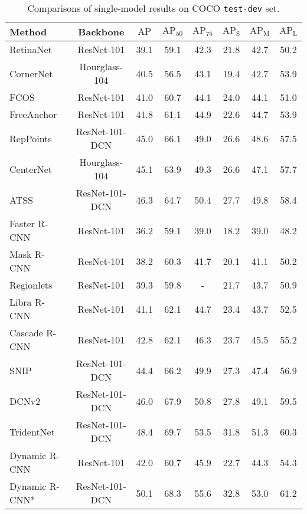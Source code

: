 \documentclass[runningheads]{llncs}
\begin{document}
\begin{table}[!t]
    \caption{Comparisons of single-model results on COCO \texttt{test-dev} set.}
    \label{tab:overall}
    \begin{center}
\setlength{\tabcolsep}{3pt}
\begin{tabular}{lccccccc}
\toprule
Method & Backbone & $\mathrm{AP}$ & $\mathrm{AP}_{50}$ & $\mathrm{AP}_{75}$ & $\mathrm{AP_S}$ & $\mathrm{AP_M}$ & $\mathrm{AP_L}$\\
\midrule
RetinaNet~\cite{FocalLoss} & ResNet-101 & 39.1 & 59.1 & 42.3 & 21.8 & 42.7 & 50.2\\
CornerNet~\cite{CornerNet} & Hourglass-104 & 40.5 & 56.5 & 43.1 & 19.4 & 42.7 & 53.9\\
FCOS~\cite{FCOS} & ResNet-101 & 41.0 & 60.7 & 44.1 & 24.0 & 44.1 & 51.0\\
FreeAnchor~\cite{FreeAnchor} & ResNet-101 & 41.8 & 61.1 & 44.9 & 22.6 & 44.7 & 53.9\\
RepPoints~\cite{RepPoints} & ResNet-101-DCN & 45.0 & 66.1 & 49.0 & 26.6 & 48.6 & 57.5\\
CenterNet~\cite{CenterNet} & Hourglass-104 & 45.1 & 63.9 & 49.3 & 26.6 & 47.1 & 57.7\\
ATSS~\cite{ATSS} & ResNet-101-DCN & 46.3 & 64.7 & 50.4 & 27.7 & 49.8 & 58.4\\
\midrule
Faster R-CNN~\cite{FPN} & ResNet-101 & 36.2 & 59.1 & 39.0 & 18.2 & 39.0 & 48.2\\
Mask R-CNN~\cite{MaskRCNN} & ResNet-101 & 38.2 & 60.3 & 41.7 & 20.1 & 41.1 & 50.2\\
Regionlets~\cite{Regionlets} & ResNet-101 & 39.3 & 59.8 & - & 21.7 & 43.7 & 50.9\\
Libra R-CNN~\cite{LibraRCNN} & ResNet-101 & 41.1 & 62.1 & 44.7 & 23.4 & 43.7 & 52.5\\
Cascade R-CNN~\cite{CascadeRCNN} & ResNet-101 & 42.8 & 62.1 & 46.3 & 23.7 & 45.5 & 55.2\\
SNIP~\cite{SNIP} & ResNet-101-DCN & 44.4 & 66.2 & 49.9 & 27.3 & 47.4 & 56.9\\
DCNv2~\cite{DCNv2} & ResNet-101-DCN & 46.0 & 67.9 & 50.8 & 27.8 & 49.1 & 59.5\\
TridentNet~\cite{TridentNet} & ResNet-101-DCN & 48.4 & 69.7 & 53.5 & 31.8 & 51.3 & 60.3\\
\midrule
Dynamic R-CNN & ResNet-101 & 42.0 & 60.7 & 45.9 & 22.7 & 44.3 & 54.3\\
Dynamic R-CNN* & ResNet-101-DCN & 50.1 & 68.3 & 55.6 & 32.8 & 53.0 & 61.2\\
\bottomrule
\end{tabular}
\end{center}
 \end{table}
\end{document}

